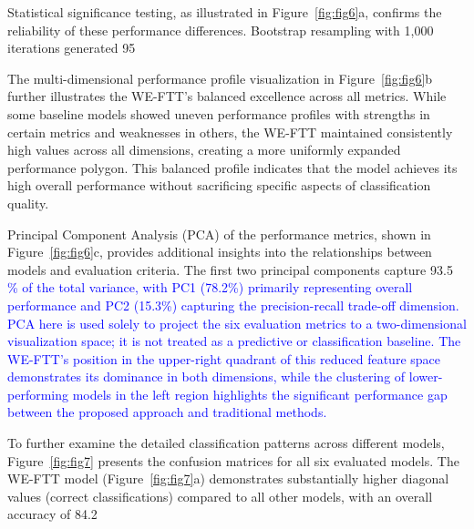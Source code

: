\documentclass[preprint,review,12pt,authoryear]{elsarticle}
\providecommand{\DIFaddtex}[1]{{\sf #1}} %
\providecommand{\DIFaddbegin}{} %
\providecommand{\DIFaddend}{} %
\providecommand{\DIFadd}[1]{\texorpdfstring{\DIFaddtex{#1}}{#1}} %
\newcommand{\DIFaddincludegraphics}[2][]{{\color{blue}\fbox{\DIFOincludegraphics[#1]{#2}}}} %
\DeclareRobustCommand{\DIFaddbegin}{\DIFOaddbegin \let\includegraphics\DIFaddincludegraphics} %
\DeclareRobustCommand{\DIFaddend}{\DIFOaddend \let\includegraphics\DIFOincludegraphics} %
\renewcommand{\DIFaddtex}[1]{\textcolor{blue}{#1}}
\begin{document}
Statistical significance testing, as illustrated in Figure~\ref{fig:fig6}a, confirms the reliability of these performance differences. Bootstrap resampling with 1,000 iterations generated 95%

The multi-dimensional performance profile visualization in Figure~\ref{fig:fig6}b further illustrates the WE-FTT's balanced excellence across all metrics. While some baseline models showed uneven performance profiles with strengths in certain metrics and weaknesses in others, the WE-FTT maintained consistently high values across all dimensions, creating a more uniformly expanded performance polygon. This balanced profile indicates that the model achieves its high overall performance without sacrificing specific aspects of classification quality.

Principal Component Analysis (PCA) of the performance metrics, shown in Figure~\ref{fig:fig6}c, provides additional insights into the relationships between models and evaluation criteria. The first two principal components capture 93.5%
\DIFaddbegin \DIFadd{\% of the total variance, with PC1 (78.2\%) primarily representing overall performance and PC2 (15.3\%) capturing the precision-recall trade-off dimension. PCA here is used solely to project the six evaluation metrics to a two-dimensional visualization space; it is not treated as a predictive or classification baseline. The WE-FTT's position in the upper-right quadrant of this reduced feature space demonstrates its dominance in both dimensions, while the clustering of lower-performing models in the left region highlights the significant performance gap between the proposed approach and traditional methods.
}\DIFaddend 

To further examine the detailed classification patterns across different models, Figure~\ref{fig:fig7} presents the confusion matrices for all six evaluated models. The WE-FTT model (Figure~\ref{fig:fig7}a) demonstrates substantially higher diagonal values (correct classifications) compared to all other models, with an overall accuracy of 84.2%
\end{document}
